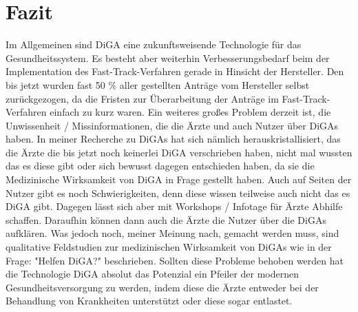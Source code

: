 \documentclass{article}
\begin{document}
	\section{Fazit}
		Im Allgemeinen sind DiGA eine zukunftsweisende Technologie für das Gesundheitssystem. Es besteht aber weiterhin Verbesserungsbedarf beim der Implementation des Fast-Track-Verfahren gerade in Hinsicht der Hersteller. Den bis jetzt wurden fast 50 \% aller gestellten Anträge vom Hersteller selbst zurückgezogen, da die Fristen zur Überarbeitung der Anträge im Fast-Track-Verfahren einfach zu kurz waren. Ein weiteres großes Problem derzeit ist, die Unwissenheit / Missinformationen, die die Ärzte und auch Nutzer über DiGAs haben. In meiner Recherche zu DiGAs hat sich nämlich herauskristallisiert, das die Ärzte die bis jetzt noch keinerlei DiGA verschrieben haben, nicht mal wussten das es diese gibt oder sich bewusst dagegen entschieden haben, da sie die Medizinische Wirksamkeit von DiGA in Frage gestellt haben. Auch auf Seiten der Nutzer gibt es noch Schwierigkeiten, denn diese wissen teilweise auch nicht das es DiGA gibt. Dagegen lässt sich aber mit Workshops / Infotage für Ärzte Abhilfe schaffen. Daraufhin können dann auch die Ärzte die Nutzer über die DiGAs aufklären. Was jedoch noch, meiner Meinung nach, gemacht werden muss, sind qualitative Feldstudien zur medizinischen Wirksamkeit von DiGAs wie in der Frage: "Helfen DiGA?" beschrieben. Sollten diese Probleme behoben werden hat die Technologie DiGA absolut das Potenzial ein Pfeiler der modernen Gesundheitsversorgung zu werden, indem diese die Ärzte entweder bei der Behandlung von Krankheiten unterstützt oder diese sogar entlastet.        
		          
			   	 


\end{document}
